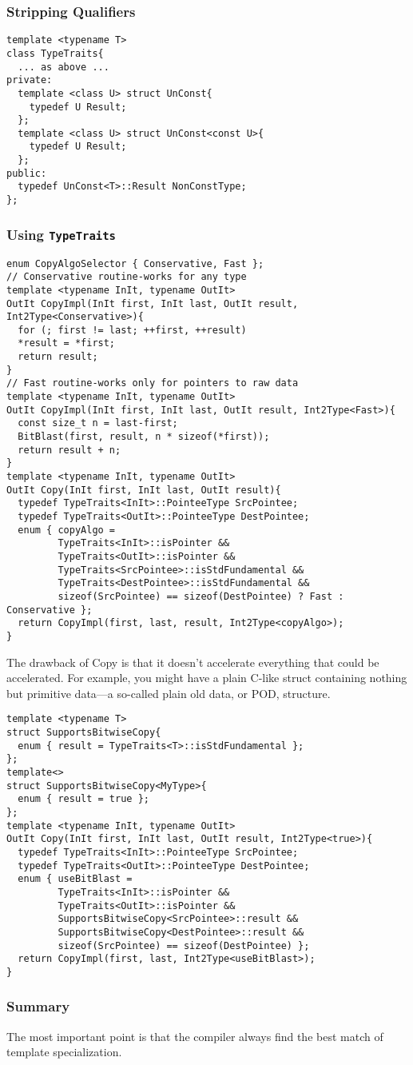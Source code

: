 \subsubsection{Stripping Qualifiers}

\begin{verbatim}
template <typename T>
class TypeTraits{
  ... as above ...
private:
  template <class U> struct UnConst{
    typedef U Result;
  };
  template <class U> struct UnConst<const U>{
    typedef U Result;
  };
public:
  typedef UnConst<T>::Result NonConstType;
};
\end{verbatim}

\subsubsection{Using \texttt{TypeTraits}}

\begin{verbatim}
enum CopyAlgoSelector { Conservative, Fast };
// Conservative routine-works for any type
template <typename InIt, typename OutIt>
OutIt CopyImpl(InIt first, InIt last, OutIt result, Int2Type<Conservative>){
  for (; first != last; ++first, ++result)
  *result = *first;
  return result;
}
// Fast routine-works only for pointers to raw data
template <typename InIt, typename OutIt>
OutIt CopyImpl(InIt first, InIt last, OutIt result, Int2Type<Fast>){
  const size_t n = last-first;
  BitBlast(first, result, n * sizeof(*first));
  return result + n;
}
template <typename InIt, typename OutIt>
OutIt Copy(InIt first, InIt last, OutIt result){
  typedef TypeTraits<InIt>::PointeeType SrcPointee;
  typedef TypeTraits<OutIt>::PointeeType DestPointee;
  enum { copyAlgo = 
         TypeTraits<InIt>::isPointer &&
         TypeTraits<OutIt>::isPointer &&
         TypeTraits<SrcPointee>::isStdFundamental &&
         TypeTraits<DestPointee>::isStdFundamental &&
         sizeof(SrcPointee) == sizeof(DestPointee) ? Fast : Conservative };
  return CopyImpl(first, last, result, Int2Type<copyAlgo>);
}
\end{verbatim}

The drawback of Copy is that it doesn't accelerate everything that
could be accelerated. For example, you  might have a plain C-like
struct containing nothing but primitive data—a so-called plain old
data, or POD, structure.
\begin{verbatim}
template <typename T> 
struct SupportsBitwiseCopy{
  enum { result = TypeTraits<T>::isStdFundamental };
};
template<> 
struct SupportsBitwiseCopy<MyType>{
  enum { result = true };
};
template <typename InIt, typename OutIt>
OutIt Copy(InIt first, InIt last, OutIt result, Int2Type<true>){
  typedef TypeTraits<InIt>::PointeeType SrcPointee;
  typedef TypeTraits<OutIt>::PointeeType DestPointee;
  enum { useBitBlast =
         TypeTraits<InIt>::isPointer &&
         TypeTraits<OutIt>::isPointer &&
         SupportsBitwiseCopy<SrcPointee>::result &&
         SupportsBitwiseCopy<DestPointee>::result &&
         sizeof(SrcPointee) == sizeof(DestPointee) };
  return CopyImpl(first, last, Int2Type<useBitBlast>);
}
\end{verbatim}

\subsubsection{Summary}

The most important point is that the compiler always find the best
match of template specialization.
